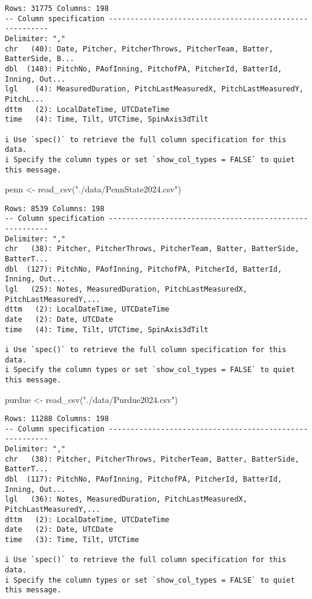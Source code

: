 \documentclass[
  letterpaper,
  DIV=11,
  numbers=noendperiod]{scrartcl}
\newenvironment{Shaded}{\begin{snugshade}}{\end{snugshade}}
\newcommand{\FunctionTok}[1]{\textcolor[rgb]{0.28,0.35,0.67}{#1}}
\newcommand{\NormalTok}[1]{\textcolor[rgb]{0.00,0.23,0.31}{#1}}
\newcommand{\OtherTok}[1]{\textcolor[rgb]{0.00,0.23,0.31}{#1}}
\newcommand{\StringTok}[1]{\textcolor[rgb]{0.13,0.47,0.30}{#1}}
\begin{document}
\begin{verbatim}
Rows: 31775 Columns: 198
-- Column specification --------------------------------------------------------
Delimiter: ","
chr   (40): Date, Pitcher, PitcherThrows, PitcherTeam, Batter, BatterSide, B...
dbl  (148): PitchNo, PAofInning, PitchofPA, PitcherId, BatterId, Inning, Out...
lgl    (4): MeasuredDuration, PitchLastMeasuredX, PitchLastMeasuredY, PitchL...
dttm   (2): LocalDateTime, UTCDateTime
time   (4): Time, Tilt, UTCTime, SpinAxis3dTilt

i Use `spec()` to retrieve the full column specification for this data.
i Specify the column types or set `show_col_types = FALSE` to quiet this message.
\end{verbatim}

\begin{Shaded}
\begin{Highlighting}[]
\NormalTok{penn }\OtherTok{\textless{}{-}} \FunctionTok{read\_csv}\NormalTok{(}\StringTok{"./data/PennState2024.csv"}\NormalTok{)}
\end{Highlighting}
\end{Shaded}

\begin{verbatim}
Rows: 8539 Columns: 198
-- Column specification --------------------------------------------------------
Delimiter: ","
chr   (38): Pitcher, PitcherThrows, PitcherTeam, Batter, BatterSide, BatterT...
dbl  (127): PitchNo, PAofInning, PitchofPA, PitcherId, BatterId, Inning, Out...
lgl   (25): Notes, MeasuredDuration, PitchLastMeasuredX, PitchLastMeasuredY,...
dttm   (2): LocalDateTime, UTCDateTime
date   (2): Date, UTCDate
time   (4): Time, Tilt, UTCTime, SpinAxis3dTilt

i Use `spec()` to retrieve the full column specification for this data.
i Specify the column types or set `show_col_types = FALSE` to quiet this message.
\end{verbatim}

\begin{Shaded}
\begin{Highlighting}[]
\NormalTok{purdue }\OtherTok{\textless{}{-}} \FunctionTok{read\_csv}\NormalTok{(}\StringTok{"./data/Purdue2024.csv"}\NormalTok{)}
\end{Highlighting}
\end{Shaded}

\begin{verbatim}
Rows: 11288 Columns: 198
-- Column specification --------------------------------------------------------
Delimiter: ","
chr   (38): Pitcher, PitcherThrows, PitcherTeam, Batter, BatterSide, BatterT...
dbl  (117): PitchNo, PAofInning, PitchofPA, PitcherId, BatterId, Inning, Out...
lgl   (36): Notes, MeasuredDuration, PitchLastMeasuredX, PitchLastMeasuredY,...
dttm   (2): LocalDateTime, UTCDateTime
date   (2): Date, UTCDate
time   (3): Time, Tilt, UTCTime

i Use `spec()` to retrieve the full column specification for this data.
i Specify the column types or set `show_col_types = FALSE` to quiet this message.
\end{verbatim}
\end{document}
